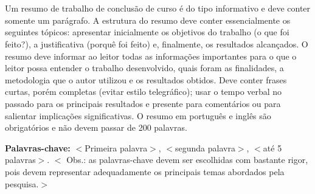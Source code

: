 \section*{}
Um resumo de trabalho de conclusão de curso é do tipo informativo e deve conter somente um parágrafo. A estrutura do resumo deve conter essencialmente os seguintes tópicos: apresentar inicialmente os objetivos do trabalho (o que foi feito?), a justificativa (porquê foi feito) e, finalmente, os resultados alcançados. O resumo deve informar ao leitor todas as informações importantes para o que o leitor possa entender o trabalho desenvolvido, quais foram as finalidades, a metodologia que o autor utilizou e os resultados obtidos. Deve conter frases curtas, porém completas (evitar estilo telegráfico); usar o tempo verbal no passado para os principais resultados e presente para comentários ou para salientar implicações significativas.  O resumo em português e inglês são obrigatórios e não devem passar de 200 palavras.

{\bf Palavras-chave:} $<$Primeira palavra$>$,  $<$segunda palavra$>$, $<$até 5 palavras$>$.
$<$ Obs.: as palavras-chave devem ser escolhidas com bastante rigor, pois devem representar adequadamente os principais temas abordados pela pesquisa.$>$


